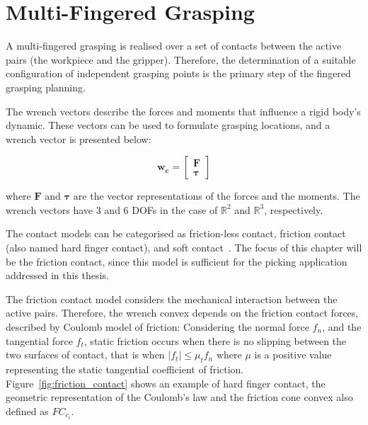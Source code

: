 \section{Multi-Fingered Grasping}
\label{sec:multifingered_grasping}

A multi-fingered grasping is realised over a set of contacts between the active pairs (the workpiece and the gripper). Therefore, the determination of a suitable configuration of independent grasping points is the primary step of the fingered grasping planning. 

The wrench vectors describe the forces and moments that influence a rigid body's dynamic. These vectors can be used to formulate grasping locations, and a wrench vector is presented below:  

\begin{equation}
\mathbf{w_{c}}=\left[\begin{array}{l}
\mathbf{F} \\
\mathbf{\tau}
\end{array}\right]
\end{equation}

\noindent
where $\mathbf{F}$ and $\mathbf{\tau}$ are the vector representations of the forces and the moments. The wrench vectors have 3 and 6 \acp{DOF} in the case of $\mathbb{R}^2$ and $\mathbb{R}^3$, respectively.

The contact models can be categorised as friction-less contact, friction contact (also named hard finger contact), and soft contact~\cite{murray1994mathematical}. The focus of this chapter will be the friction contact, since this model is sufficient for the picking application addressed in this thesis.

The friction contact model considers the mechanical interaction between the active pairs. Therefore, the wrench convex depends on the friction contact forces, described by Coulomb model of friction: Considering the normal force $f_n$, and the tangential force $f_t$, static friction occurs when there is no slipping between the two surfaces of contact, that is when $\left|f_{t}\right| \leq \mu_{t} f_{n}
$ where $\mu $ is a positive value representing the static tangential coefficient of friction. Figure~\ref{fig:friction_contact} shows an example of hard finger contact, the geometric representation of the Coulomb’s law and the friction cone convex also defined as ${FC}_{c_i}$. 


